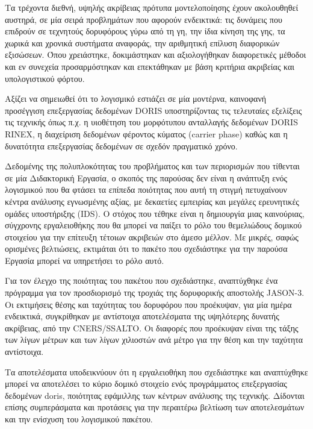 Τα τρέχοντα διεθνή, υψηλής ακρίβειας πρότυπα μοντελοποίησης έχουν ακολουθηθεί αυστηρά, σε μία σειρά
προβλημάτων που αφορούν ενδεικτικά: τις δυνάμεις που επιδρούν σε τεχνητούς δορυφόρους γύρω από τη γη,
την ίδια κίνηση της γης, τα χωρικά και χρονικά συστήματα αναφοράς, την αριθμητική επίλυση
διαφορικών εξισώσεων. Όπου χρειάστηκε, δοκιμάστηκαν και αξιολογήθηκαν διαφορετικές μέθοδοι και
εν συνεχεία προσαρμόστηκαν και επεκτάθηκαν με βάση κριτήρια ακριβείας και υπολογιστικού φόρτου.

Αξίζει να σημειωθεί ότι το λογισμικό εστιάζει σε μία μοντέρνα, καινοφανή προσέγγιση επεξεργασίας 
δεδομένων \textlatin{DORIS} υποστηρίζοντας τις τελευταίες εξελίξεις τις τεχνικής όπως π.χ. η υιοθέτηση του 
μορφότυπου ανταλλαγής δεδομένων \textlatin{DORIS RINEX}, η διαχείριση δεδομένων φέροντος κύματος 
(\textlatin{carrier phase}) καθώς και η δυνατότητα επεξεργασίας δεδομένων σε σχεδόν πραγματικό χρόνο.

Δεδομένης της πολυπλοκότητας του προβλήματος και των περιορισμών που τίθενται σε μία Διδακτορική Εργασία,
ο σκοπός της παρούσας δεν είναι η ανάπτυξη ενός λογισμικού που θα φτάσει τα επίπεδα ποιότητας
που αυτή τη στιγμή πετυχαίνουν κέντρα ανάλυσης εγνωσμένης αξίας, με δεκαετίες εμπειρίας και
μεγάλες ερευνητικές ομάδες υποστήριξης (\textlatin{IDS}). Ο στόχος που τέθηκε είναι η δημιουργία μιας
καινούριας, σύγχρονης εργαλειοθήκης που θα μπορεί να παίξει το ρόλο του θεμελιώδους δομικού στοιχείου για
την επίτευξη τέτοιων ακριβειών στο άμεσο μέλλον. Με μικρές, σαφώς ορισμένες βελτιώσεις, εκτιμάται ότι
το πακέτο που σχεδιάστηκε για την παρούσα Εργασία μπορεί να υπηρετήσει το ρόλο αυτό.

Για τον έλεγχο της ποιότητας του πακέτου που σχεδιάστηκε, αναπτύχθηκε ένα πρόγραμμα για τον προσδιορισμό
της τροχιάς της δορυφορικής αποστολής \textlatin{JASON}-3. Οι εκτιμήσεις θέσης και ταχύτητας του δορυφόρου
που προέκυψαν, για μία ημέρα ενδεικτικά, συγκρίθηκαν με αντίστοιχα αποτελέσματα της υψηλότερης
δυνατής ακρίβειας, από την \textlatin{CNERS/SSALTO}. Οι διαφορές που προέκυψαν είναι της τάξης των λίγων μέτρων
και των λίγων χιλιοστών ανά μέτρο για την θέση και την ταχύτητα αντίστοιχα.

Τα αποτελέσματα υποδεικνύουν ότι η εργαλειοθήκη που σχεδιάστηκε και αναπτύχθηκε μπορεί να
αποτελέσει το κύριο δομικό στοιχείο ενός προγράμματος επεξεργασίας δεδομένων \textlatin{doris},
ποιότητας εφάμιλλης των κέντρων ανάλυσης της τεχνικής. Δίδονται επίσης συμπεράσματα και
προτάσεις για την περαιτέρω βελτίωση των αποτελεσμάτων και την ενίσχυση του λογισμικού πακέτου.
